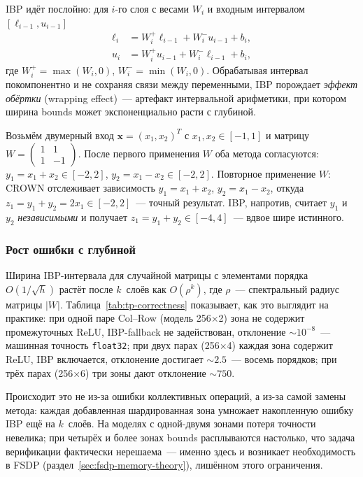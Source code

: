 IBP идёт послойно: для $i$-го слоя с весами $W_i$ и входным
интервалом $[\ell_{i-1}, u_{i-1}]$
\begin{align*}
\ell_i &= W_i^+ \ell_{i-1} + W_i^- u_{i-1} + b_i, \\
u_i   &= W_i^+ u_{i-1} + W_i^- \ell_{i-1} + b_i,
\end{align*}
где $W_i^+ = \max(W_i, 0)$, $W_i^- = \min(W_i, 0)$.
Обрабатывая интервал покомпонентно и не сохраняя связи между
переменными, IBP порождает \textit{эффект обёртки}
(wrapping effect)\cite{moore2009interval}~--- артефакт интервальной
арифметики, при котором ширина bounds может экспоненциально расти
с глубиной.

Возьмём двумерный вход $\mathbf{x} = (x_1, x_2)^T$
с $x_1, x_2 \in [-1, 1]$ и матрицу
$W = \begin{pmatrix} 1 & 1 \\ 1 & -1 \end{pmatrix}$.
После первого применения $W$ оба метода согласуются:
$y_1 = x_1 + x_2 \in [-2, 2]$, $y_2 = x_1 - x_2 \in [-2, 2]$.
Повторное применение $W$: CROWN отслеживает зависимость
$y_1 = x_1 + x_2$, $y_2 = x_1 - x_2$, откуда
$z_1 = y_1 + y_2 = 2x_1 \in [-2, 2]$~--- точный результат.
IBP, напротив, считает $y_1$ и $y_2$ \textit{независимыми}
и получает $z_1 = y_1 + y_2 \in [-4, 4]$~--- вдвое шире истинного.

\subsubsection{Рост ошибки с глубиной}

Ширина IBP-интервала для случайной матрицы с элементами
порядка $O(1/\sqrt{h})$ растёт после $k$~слоёв как $O(\rho^k)$,
где $\rho$~--- спектральный радиус матрицы $|W|$.
Таблица~\ref{tab:tp-correctness} показывает, как это выглядит
на практике: при одной паре Col--Row (модель 256$\times$2) зона
не содержит промежуточных ReLU, IBP-fallback не задействован,
отклонение $\sim 10^{-8}$~--- машинная точность \texttt{float32};
при двух парах (256$\times$4) каждая зона содержит ReLU, IBP включается,
отклонение достигает $\sim 2.5$~--- восемь порядков; при трёх парах
(256$\times$6) три зоны дают отклонение $\sim 750$.

Происходит это не из-за ошибки коллективных операций, а из-за самой
замены метода: каждая добавленная шардированная зона умножает
накопленную ошибку IBP ещё на $k$~слоёв.
На моделях с одной-двумя зонами потеря точности невелика; при четырёх
и более зонах bounds расплываются настолько, что задача верификации
фактически нерешаема~--- именно здесь и возникает необходимость
в FSDP (раздел~\ref{sec:fsdp-memory-theory}), лишённом этого ограничения.

